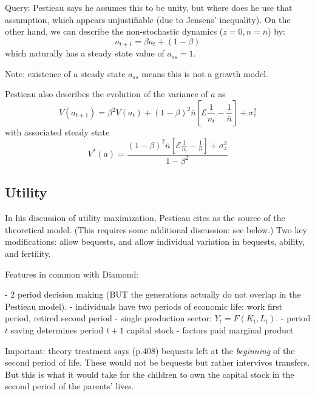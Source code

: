 \documentclass{article}
\newcommand{\E}{\mathcal{E}}
\begin{document}

Query: Pestieau says he assumes this to be unity, but where does he use that assumption,
which appears unjustifiable (due to Jensens' inequality).
On the other hand,
we can describe the non-stochastic dynamics ($z=0, n=\bar{n}$) by:
\begin{equation}
a_{t+1} = \beta a_{t} + (1-\beta)
\end{equation}
which naturally has a steady state value of $a_{ss}=1$.

Note: existence of a steady state $a_{ss}$ means this is not a growth model.

Pestieau also describes the evolution of the variance of $a$ as
\begin{equation}
V(a_{t+1}) = \beta^{2} V(a_{t}) + (1-\beta)^{2}\bar{n}[\E \frac{1}{n_{t}} - \frac{1}{\bar{n}}] + \sigma_{z}^{2}
\tag{Pestieau 5}
\end{equation}
with associated steady state
\begin{equation}
V^{*}(a) = \frac{(1-\beta)^{2}\bar{n}[\E \frac{1}{n_{t}} - \frac{1}{\bar{n}}] + \sigma_{z}^{2}}{1-\beta^{2}}
\tag{Pestieau 6}
\end{equation}

\subsection{Utility}

In his discussion of utility maximization,
Pestieau cites \citet{diamond-1965-aer} as the source of the theoretical model.
(This requires some additional discussion: see below.)
Two key modifications:
allow bequests,
and allow individual variation in bequests, ability, and fertility.

Features in common with Diamond:

- 2 period decision making (BUT the generations actually do not overlap in the Pestieau model).
- individuals have two periods of economic life: work first period, retired second period
- single production sector: $Y_{t} = F(K_{t}, L_{t})$.
- period $t$ saving determines period $t+1$ capital stock
- factors paid marginal product

Important:
theory treatment says (p.408) bequests left at the \emph{beginning} of the second period of life.
These would not be bequests but rather intervivos transfers.
But this is what it would take for the children to own the capital stock in the second period of the parents' lives.
\end{document}
